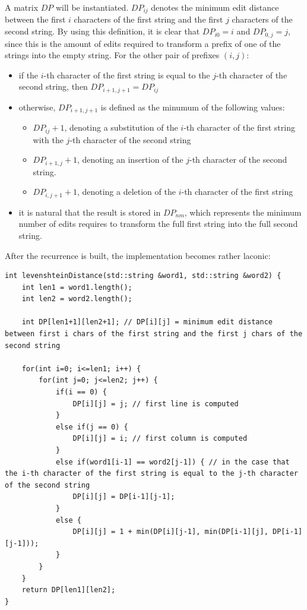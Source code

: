 \documentclass[letterpaper]{article}
\begin{document}
A matrix $DP$ will be instantiated. $DP_{ij}$ denotes the minimum edit distance between the first $i$ characters of the first string and the first $j$ characters of the second string. By using this definition, it is clear that $DP_{i0} = i$ and $DP_{0,j} = j$, since this is the amount of edits required to transform a prefix of one of the strings into the empty string.
For the other pair of prefixes $(i, j)$:

\begin{itemize}
    \item if the $i$-th character of the first string is equal to the $j$-th character of the second string, then $DP_{i + 1, j + 1} = DP_{ij}$
    \item otherwise, $DP_{i + 1, j + 1}$ is defined as the minumum of the following values:
    \begin{itemize}
        \item $DP_{ij} + 1$, denoting a substitution of the $i$-th character of the first string with the $j$-th character of the second string
        \item $DP_{i + 1, j} + 1$, denoting an insertion of the $j$-th character of the second string.
        \item $DP_{i, j + 1} + 1$, denoting a deletion of the $i$-th character of the first string
    \end{itemize}
    \item it is natural that the result is stored in $DP_{nm}$, which represents the minimum number of edits requires to transform the full first string into the full second string.
\end{itemize}

After the recurrence is built, the implementation becomes rather laconic:

\begin{lstlisting}
int levenshteinDistance(std::string &word1, std::string &word2) {
    int len1 = word1.length();
    int len2 = word2.length();

    int DP[len1+1][len2+1]; // DP[i][j] = minimum edit distance between first i chars of the first string and the first j chars of the second string

    for(int i=0; i<=len1; i++) {
        for(int j=0; j<=len2; j++) {
            if(i == 0) {
                DP[i][j] = j; // first line is computed
            }
            else if(j == 0) {
                DP[i][j] = i; // first column is computed
            }
            else if(word1[i-1] == word2[j-1]) { // in the case that the i-th character of the first string is equal to the j-th character of the second string
                DP[i][j] = DP[i-1][j-1];
            }
            else {
                DP[i][j] = 1 + min(DP[i][j-1], min(DP[i-1][j], DP[i-1][j-1]));
            }
        }
    }
    return DP[len1][len2];
}
\end{lstlisting}
\end{document}
